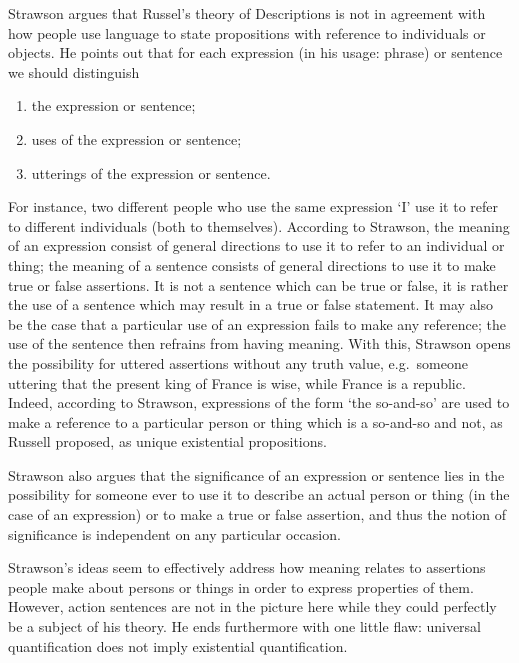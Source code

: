 \documentclass{article}
\begin{document}
\maketitle

Strawson argues that Russel's theory of Descriptions is not in agreement with
how people use language to state propositions with reference to individuals
or objects. He points out that for each expression (in his usage: phrase) or 
sentence we should distinguish
\begin{enumerate}
\item the expression or sentence;
\item uses of the expression or sentence;
\item utterings of the expression or sentence.
\end{enumerate}
For instance, two different
people who use the same expression `I' use it to refer to different individuals
(both to themselves). 
According to Strawson, the meaning of an expression consist of general 
directions to use it to refer to an individual or thing; the meaning of a
sentence consists of general directions to use it to make true or false 
assertions. It is not a sentence which can be true or false, it is rather the
use of a sentence which may result in a true or false statement. It may also be
the case that a particular use of an expression fails to make any reference; the
use of the sentence then refrains from having meaning. With this, Strawson opens
the possibility for uttered assertions without any truth value, e.g.~someone
uttering that the present king of France is wise, while France is a republic.
Indeed, according to Strawson, expressions of the form `the so-and-so' are used
to make a reference to a particular person or thing which is a so-and-so and
not, as Russell proposed, as unique existential propositions.

Strawson also argues that the significance of an expression or sentence lies
in the possibility for someone ever to use it to describe an actual person or 
thing (in the case of an expression) or to make a true or false assertion, and
thus the notion of significance is independent on any particular occasion.

Strawson's ideas seem to effectively address how meaning relates to assertions
people make about persons or things in order to express properties of them.
However, action sentences are not in the picture here while they could perfectly
be a subject of his theory. He ends furthermore with one little flaw: universal
quantification does not imply existential quantification. 
\end{document}
